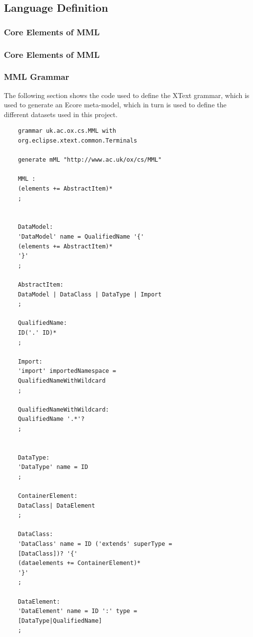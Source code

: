 \documentclass{llncs}
\begin{document}
\subsection{Language Definition}

\subsubsection{Core Elements of MML}

\subsubsection{Core Elements of MML}

\subsubsection{MML Grammar}

The following section shows the code used to define the XText grammar, which is used to generate an Ecore meta-model, which in turn is used to define the different datasets used in this project.
\begin{small}
	\begin{verbatim}
	grammar uk.ac.ox.cs.MML with 
	org.eclipse.xtext.common.Terminals
	
	generate mML "http://www.ac.uk/ox/cs/MML"
	
	MML :
	(elements += AbstractItem)*
	;
	
	
	DataModel:
	'DataModel' name = QualifiedName '{'
	(elements += AbstractItem)*
	'}'
	;
	
	AbstractItem:
	DataModel | DataClass | DataType | Import
	;
	
	QualifiedName:
	ID('.' ID)*
	;
	
	Import:
	'import' importedNamespace = 
	QualifiedNameWithWildcard
	;
	
	QualifiedNameWithWildcard:
	QualifiedName '.*'?
	;
	
	
	DataType:
	'DataType' name = ID
	;
	
	ContainerElement:
	DataClass| DataElement
	;
	
	DataClass:
	'DataClass' name = ID ('extends' superType =
	[DataClass])? '{'
	(dataelements += ContainerElement)*
	'}'
	;
	
	DataElement:
	'DataElement' name = ID ':' type =  
	[DataType|QualifiedName]
	;
	\end{verbatim}
\end{small}
\end{document}
